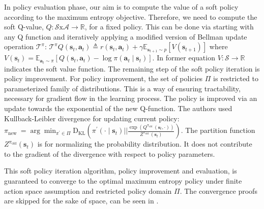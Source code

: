 In policy evaluation phase, our aim is to compute the value of a soft policy according to the maximum entropy objective. Therefore, we need to compute the soft Q-value, $Q\!:\!\mathcal{S}\text{x}\mathcal{A}\!\rightarrow\!\mathbb{R}$, for a fixed policy. This can be done via starting with any Q function and iteratively applying a modified version of Bellman update operation $\mathcal{T}^\pi$: $ \mathcal{T}^\pi Q\left(\mathbf{s}_t, \mathbf{a}_t\right) \triangleq r\left(\mathbf{s}_t, \mathbf{a}_t\right)+\gamma \mathbb{E}_{\mathbf{s}_{t+1} \sim p}\left[V\left(\mathbf{s}_{t+1}\right)\right] $ where $    V\left(\mathbf{s}_t\right)=\mathbb{E}_{\mathbf{a}_t \sim \pi}\left[Q\left(\mathbf{s}_t, \mathbf{a}_t\right)-\log \pi\left(\mathbf{a}_t \mid \mathbf{s}_t\right)\right].
\label{equation:soft_policy_bellman}$ In former equation $V\!:\!\mathcal{S}\!\rightarrow\!\mathbb{R}$ indicates the soft value function. The remaining step of the soft policy iteration is policy improvement. For policy improvement, the set of policies $\Pi$ is restricted to parameterized family of distributions. This is a way of ensuring tractability, necessary for gradient flow in the learning process. The policy is improved via an update towards the exponential of the new Q-function. The authors used Kullback-Leibler divergence for updating current policy: $\pi_{\text {new }}=\arg \min _{\pi^{\prime} \in \Pi} \mathrm{D}_{\mathrm{KL}}\left(\pi^{\prime}\left(\cdot \mid \mathbf{s}_t\right) \bigg| \bigg| \frac{\exp \left(Q^{\pi_{\text {old }}}\left(\mathbf{s}_t, \cdot\right)\right)}{Z^{\pi_{\text {old }}}\left(\mathbf{s}_t\right)}\right).
$\label{eqn:soft_policy_kl} The partition function $Z^{\pi_{\mathrm{old}}}\left(\mathbf{s}_t\right)$ is for normalizing the probability distribution. It does not contribute to the gradient of the divergence with respect to policy parameters. 

This soft policy iteration algorithm, policy improvement and evaluation, is guaranteed to converge to the optimal maximum entropy policy under finite action space assumption and restricted policy domain $\Pi$. The convergence proofs are skipped for the sake of space, can be seen in \cite{HaarnojaAbbeelLevine2018:SAC}. 

